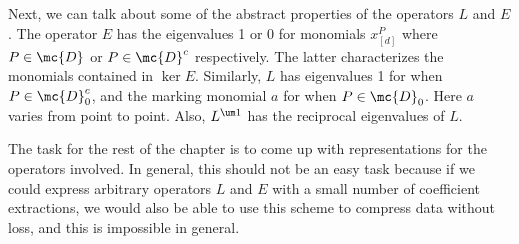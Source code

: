 Next, we can talk about some of the abstract properties of the operators $L$ and $E$. The operator $E$ has the eigenvalues 1 or 0 for monomials $x_{[d]}^P$ where $P \in \mc{D}$ or $P \in \mc{D}^c$ respectively. The latter characterizes the monomials contained in $\ker E$. Similarly, $L$ has eigenvalues 1 for when $P \in \mc{D}_0^c$, and the marking monomial $a$ for when $P\in \mc{D}_0$. Here $a$ varies from point to point. Also, $L^{\um 1}$ has the reciprocal eigenvalues of $L$.

The task for the rest of the chapter is to come up with representations for the operators involved. In general, this should not be an easy task because if we could express arbitrary operators $L$ and $E$ with a small number of coefficient extractions, we would also be able to use this scheme to compress data without loss, and this is impossible in general.



